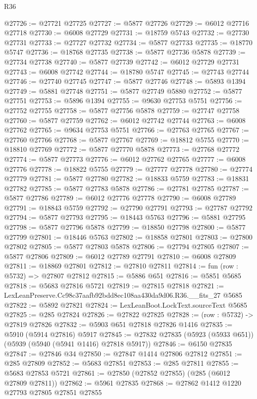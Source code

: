 \begin{lexlean}{R36}
\begin{coremodule}
@27726 := @27721 @27725
@27727 := @5877 @27726
@27729 := @6012 @27716 @27718
@27730 := @6008 @27729
@27731 := @18759 @5743
@27732 := @27730 @27731
@27733 := @27727 @27732
@27734 := @5877 @27733
@27735 := @18770 @5747
@27736 := @18768 @27735
@27738 := @5877 @27736 @5878
@27739 := @27734 @27738
@27740 := @5877 @27739
@27742 := @6012 @27729 @27731
@27743 := @6008 @27742
@27744 := @18780 @5747
@27745 := @27743 @27744
@27746 := @27740 @27745
@27747 := @5877 @27746
@27748 := @5893 @1394
@27749 := @5881 @27748
@27751 := @5877 @27749 @5880
@27752 := @5877 @27751
@27753 := @5896 @1394
@27755 := @9630 @27753 @5751
@27756 := @27752 @27755
@27758 := @5877 @27756 @5878
@27759 := @27747 @27758
@27760 := @5877 @27759
@27762 := @6012 @27742 @27744
@27763 := @6008 @27762
@27765 := @9634 @27753 @5751
@27766 := @27763 @27765
@27767 := @27760 @27766
@27768 := @5877 @27767
@27769 := @18812 @5755
@27770 := @18810 @27769
@27772 := @5877 @27770 @5878
@27773 := @27768 @27772
@27774 := @5877 @27773
@27776 := @6012 @27762 @27765
@27777 := @6008 @27776
@27778 := @18822 @5755
@27779 := @27777 @27778
@27780 := @27774 @27779
@27781 := @5877 @27780
@27782 := @18833 @5759
@27783 := @18831 @27782
@27785 := @5877 @27783 @5878
@27786 := @27781 @27785
@27787 := @5877 @27786
@27789 := @6012 @27776 @27778
@27790 := @6008 @27789
@27791 := @18843 @5759
@27792 := @27790 @27791
@27793 := @27787 @27792
@27794 := @5877 @27793
@27795 := @18443 @5763
@27796 := @5881 @27795
@27798 := @5877 @27796 @5878
@27799 := @18850 @27798
@27800 := @5877 @27799
@27801 := @18446 @5763
@27802 := @18858 @27801
@27803 := @27800 @27802
@27805 := @5877 @27803 @5878
@27806 := @27794 @27805
@27807 := @5877 @27806
@27809 := @6012 @27789 @27791
@27810 := @6008 @27809
@27811 := @18869 @27801
@27812 := @27810 @27811
@27814 := fun (row : @5732) => @27807 @27812
@27815 := @5886 @651
@27816 := @5851 @5685
@27818 := @5683 @27816 @5721
@27819 := @27815 @27818
@27821 := LexLeanPreserve.Cc98c37aafb92bdd8ec108aa430da9d06.R36.__fits_27 @5685
@27822 := @5892 @27821
@27824 := LexLeanBoot.LockText.sourceText @5685
@27825 := @285 @27824
@27826 := @27822 @27825
@27828 := (row : @5732) -> @27819 @27826
@27832 := @5903 @651 @27818 @27826 @1416
@27835 := @5910 (@5914 @27816) @5917
@27845 := @27832 @27835 (@5923 (@5933 @651)) (@5939 (@5940 (@5941 @1416) @27818 @5917))
@27846 := @6150 @27835
@27847 := @27846 @34
@27850 := @27847 @1414 @27806 @27812
@27851 := @285 @27809
@27852 := @5683 @27851
@27853 := @285 @27811
@27855 := @5683 @27853 @5721
@27861 := @27850 (@27852 @27855) (@285 (@6012 @27809 @27811))
@27862 := @5961 @27835
@27868 := @27862 @1412 @1220 @27793 @27805 @27851 @27855

\end{coremodule}
\end{lexlean}
